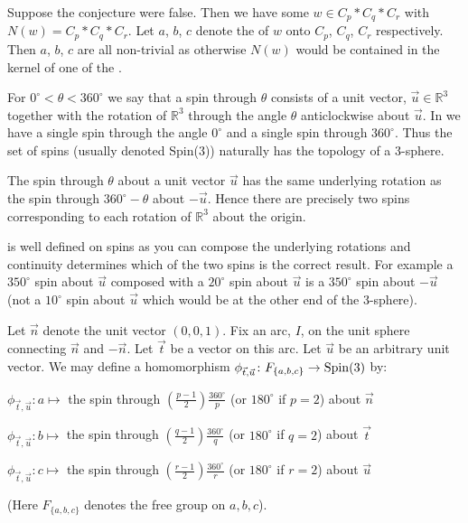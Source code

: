 \documentclass[12pt]{article}
\begin{document}
Suppose the conjecture were false.  Then we have some $w\in C_p *
C_q * C_r$ with $N(w)= C_p * C_q * C_r$.  Let $a$, $b$, $c$ denote
the  of $w$ onto $C_p$, $C_q$, $C_r$ respectively. Then
$a$, $b$, $c$ are all non-trivial as otherwise $N(w)$ would be
contained in the kernel of one of the .

For $0^\circ < \theta <360^\circ$ we say that a spin through
$\theta$ consists of a unit vector, $\vec{u} \in \mathbb{R}^3$ together with the
rotation of $\mathbb{R}^3$ through the angle $\theta$ anticlockwise about $\vec{u}$.
In  we have a single spin through the angle $0^\circ$ and
a single spin through $360^\circ$.  Thus the set of spins
(usually denoted Spin(3)) naturally has the topology of a
3-sphere.


The spin through $\theta$ about a unit vector $\vec{u}$ has the
same underlying rotation as the spin through $360^\circ-\theta$
about $-\vec{u}$.  Hence there are precisely two spins
corresponding to each rotation of $\mathbb{R}^3$ about the origin.

 is well defined on spins as you can compose the
underlying rotations and continuity determines which of the two
spins is the correct result.  For example a $350^\circ$ spin about
$\vec{u}$ composed with a $20^\circ$ spin about $\vec{u}$ is a
$350^\circ$ spin about $-\vec{u}$ (not a $10^\circ$ spin about
$\vec{u}$ which would be at the other end of the 3-sphere).


Let $\vec{n}$ denote the unit vector $(0,0,1)$.  Fix an arc, $I$,
on the unit sphere connecting $\vec{n}$ and $-\vec{n}$.  Let
$\vec{t}$ be a vector on this arc. Let $\vec{u}$ be an arbitrary
unit vector.  We may define a homomorphism
$\phi_{\vec{t},\vec{u}}\colon  F_{\{a,b,c\}} \to {\rm Spin}(3)$
by:

\noindent$\phi_{\vec{t},\vec{u}}\colon a \mapsto$ the spin through
$(\frac{p-1}{2}) \frac{360^\circ}{p}$ (or $180^\circ$ if $p=2$)
about $\vec{n}$


\noindent $\phi_{\vec{t},\vec{u}}\colon b \mapsto$ the spin
through $(\frac{q-1}{2}) \frac{360^\circ}{q}$ (or $180^\circ$ if
$q=2$) about $\vec{t}$

\noindent $\phi_{\vec{t},\vec{u}}\colon c \mapsto$ the spin
through $(\frac{r-1}{2}) \frac{360^\circ}{r}$ (or $180^\circ$ if
$r=2$) about $\vec{u}$

(Here $F_{\{a,b,c\}}$ denotes the free group on $a,b,c$).
\end{document}
